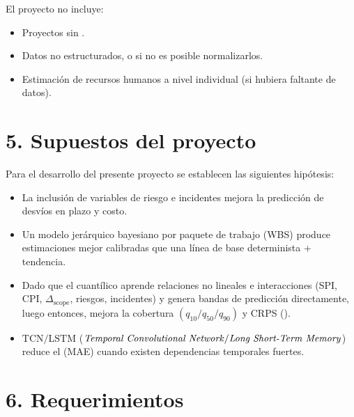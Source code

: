 \documentclass[12pt]
{charter}
\begin{document}
El proyecto no incluye:
\begin{itemize}
	\item Proyectos sin .
	\item Datos no estructurados, o si no es posible normalizarlos.
	\item Estimación de recursos humanos a nivel individual (si hubiera faltante de datos). 
\end{itemize}

\section{5. Supuestos del proyecto}
\label{sec:supuestos}

Para el desarrollo del presente proyecto se establecen las siguientes hipótesis:

\begin{itemize}
	\item La inclusión de variables de riesgo e incidentes mejora la predicción de desvíos en plazo y costo.
	\item Un modelo jerárquico bayesiano por paquete de trabajo (WBS) produce estimaciones mejor calibradas que una línea de base determinista + tendencia.
	\item Dado que el  cuantílico aprende relaciones no lineales e interacciones (SPI, CPI, $\Delta_{\text{scope}}$, riesgos, incidentes) y genera bandas de predicción directamente, luego entonces, mejora la cobertura $(q_{10}/q_{50}/q_{90})$ y CRPS ().
	\item $\text{TCN} / \text{LSTM}$ ($\text{\textit{Temporal Convolutional Network}} / \text{\textit{Long Short-Term Memory}}$) reduce el  (MAE) cuando existen dependencias temporales fuertes.
\end{itemize}


\section{6. Requerimientos}
\label{sec:requerimientos}
\end{document}
